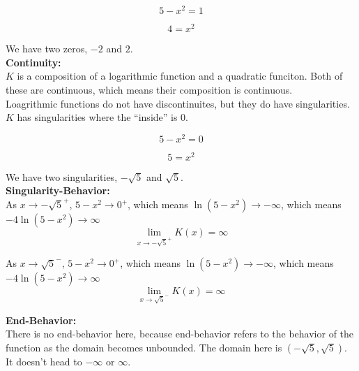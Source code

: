 \documentclass{ximera}
\begin{document}
\[
5 - x^2 = 1
\]


\[
4 = x^2
\]


We have two zeros, $-2$ and $2$. \\




\textbf{\textcolor{blue!55!black}{Continuity:}} \\


$K$ is a composition of a logarithmic function and a quadratic funciton.  Both of these are continuous, which means their composition is continuous. \\

Loagrithmic functions do not have discontinuites, but they do have singularities.  $K$ has singularities where the ``inside'' is $0$.


\[
5 - x^2 = 0
\]


\[
5 = x^2
\]



We have two singularities, $-\sqrt{5}$ and $\sqrt{5}$. \\




\textbf{\textcolor{blue!55!black}{Singularity-Behavior:}} \\



As $x \to -\sqrt{5}^+$, $5 - x^2 \to 0^+$, which means $\ln(5 - x^2) \to -\infty$, which means  $-4 \ln(5 - x^2) \to \infty$\\

\[
\lim\limits_{x \to -\sqrt{5}^+} K(x) = \infty
\]




As $x \to \sqrt{5}^-$, $5 - x^2 \to 0^+$, which means $\ln(5 - x^2) \to -\infty$, which means  $-4 \ln(5 - x^2) \to \infty$\\

\[
\lim\limits_{x \to \sqrt{5}^-} K(x) = \infty
\]
















\textbf{\textcolor{blue!55!black}{End-Behavior:}} \\

There is no end-behavior here, because end-behavior refers to the behavior of the function as the domain becomes unbounded.  The domain here is $(-\sqrt{5}, \sqrt{5})$. It doesn't head to $-\infty$ or $\infty$.
\end{document}
